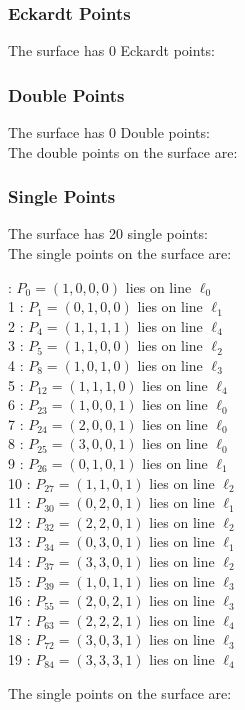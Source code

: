 \documentclass{article}
\begin{document}
{\subsubsection*{Eckardt Points}
The surface has 0 Eckardt points:\\
\subsubsection*{Double Points}
The surface has 0 Double points:\\
The double points on the surface are:\\
\begin{multicols}{2}
\noindent
\end{multicols}
\subsubsection*{Single Points}
The surface has 20 single points:\\
The single points on the surface are:\\
\begin{multicols}{2}
 : $P_{0}=( 1, 0, 0, 0 )$ lies on line $\ell_{0}$\\
1 : $P_{1}=( 0, 1, 0, 0 )$ lies on line $\ell_{1}$\\
2 : $P_{4}=( 1, 1, 1, 1 )$ lies on line $\ell_{4}$\\
3 : $P_{5}=( 1, 1, 0, 0 )$ lies on line $\ell_{2}$\\
4 : $P_{8}=( 1, 0, 1, 0 )$ lies on line $\ell_{3}$\\
5 : $P_{12}=( 1, 1, 1, 0 )$ lies on line $\ell_{4}$\\
6 : $P_{23}=( 1, 0, 0, 1 )$ lies on line $\ell_{0}$\\
7 : $P_{24}=( 2, 0, 0, 1 )$ lies on line $\ell_{0}$\\
8 : $P_{25}=( 3, 0, 0, 1 )$ lies on line $\ell_{0}$\\
9 : $P_{26}=( 0, 1, 0, 1 )$ lies on line $\ell_{1}$\\
10 : $P_{27}=( 1, 1, 0, 1 )$ lies on line $\ell_{2}$\\
11 : $P_{30}=( 0, 2, 0, 1 )$ lies on line $\ell_{1}$\\
12 : $P_{32}=( 2, 2, 0, 1 )$ lies on line $\ell_{2}$\\
13 : $P_{34}=( 0, 3, 0, 1 )$ lies on line $\ell_{1}$\\
14 : $P_{37}=( 3, 3, 0, 1 )$ lies on line $\ell_{2}$\\
15 : $P_{39}=( 1, 0, 1, 1 )$ lies on line $\ell_{3}$\\
16 : $P_{55}=( 2, 0, 2, 1 )$ lies on line $\ell_{3}$\\
17 : $P_{63}=( 2, 2, 2, 1 )$ lies on line $\ell_{4}$\\
18 : $P_{72}=( 3, 0, 3, 1 )$ lies on line $\ell_{3}$\\
19 : $P_{84}=( 3, 3, 3, 1 )$ lies on line $\ell_{4}$\\
\end{multicols}
The single points on the surface are:\\
}
\end{document}
